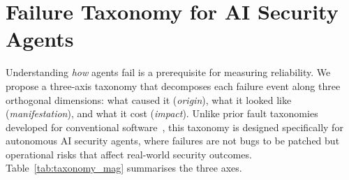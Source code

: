 \section{Failure Taxonomy for AI Security Agents}

Understanding \textit{how} agents fail is a prerequisite for measuring
reliability. We propose a three-axis taxonomy that decomposes each
failure event along three orthogonal dimensions: what caused it
(\textit{origin}), what it looked like (\textit{manifestation}), and
what it cost (\textit{impact}). Unlike prior fault taxonomies developed
for conventional software~\cite{avizienis2004}, this taxonomy is
designed specifically for autonomous AI security agents, where
failures are not bugs to be patched but operational risks that affect
real-world security outcomes. Table~\ref{tab:taxonomy_mag} summarises
the three axes.

